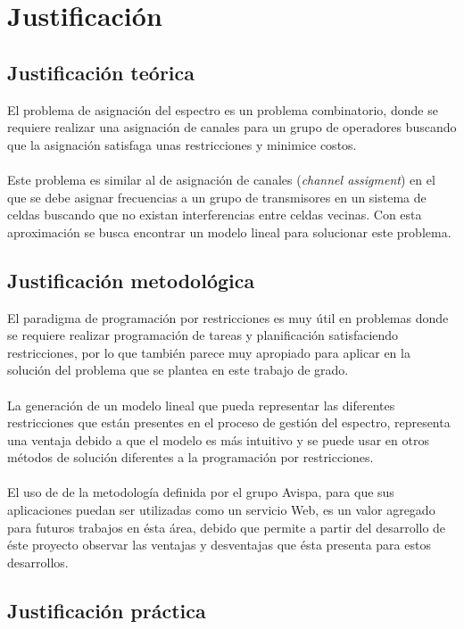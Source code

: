 \section{Justificación}

\subsection{Justificación teórica}

El problema de asignación del espectro es un problema combinatorio, donde se requiere realizar una asignación de canales para un grupo de operadores buscando que la asignación satisfaga unas restricciones y minimice costos. 
\\\\
Este problema es similar al de asignación de canales (\textit{channel assigment})\cite{680521} en el que se debe asignar frecuencias a un grupo de transmisores en un sistema de celdas buscando que no existan interferencias entre celdas vecinas. Con esta aproximación se busca encontrar un modelo lineal para solucionar este problema.

\subsection{Justificación metodológica}

El paradigma de programación por restricciones es muy útil en problemas donde se requiere realizar programación de tareas y planificación satisfaciendo restricciones, por lo que también parece muy apropiado para aplicar en la solución del problema que se plantea en este trabajo de grado.
\\\\
La generación de un modelo lineal que pueda representar las diferentes restricciones que están presentes en el proceso de gestión del espectro, representa una ventaja debido a que el modelo es más intuitivo y se puede usar en otros métodos de solución diferentes a la programación por restricciones.
\\\\
El uso de de la metodología definida por el grupo Avispa, para que sus aplicaciones puedan ser utilizadas como un servicio Web, es un valor agregado para futuros trabajos en ésta área, debido que permite a partir del desarrollo de éste proyecto observar las ventajas y desventajas que ésta presenta para estos desarrollos.


\subsection{Justificación práctica}

